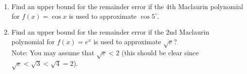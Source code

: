 \documentclass[12pt]{article}
\newif\ifans
\begin{document}
\begin{enumerate}

\item Find an upper bound for the remainder error if the $4$th Maclaurin polynomial for $f(x)=\cos{x}$ is used to approximate $\cos{5^\circ}$.



\ifans{\fbox{\parbox{1\linewidth}{If $f(x)=\cos{x}$, then $\textstyle|f^{(5)}(x)| \leq 1$ for all $x$, and so by the Remainder Estimation Theorem, $\textstyle |R_4(\frac{\pi}{36})| \leq \frac{1}{5!} \left(\frac{\pi}{36} - 0 \right)^5$.
\\ \\ This can be verified with a calculator as follows: \\ The $4$th Maclaurin polynomial for $\cos{x}$ is $\textstyle p_4(x)=1-\frac{1}{2!}x^2+\frac{1}{4!}x^4$.  
\\  Thus $\textstyle \cos{\left(\frac{\pi}{36}\right)} \approx p_4\left(\frac{\pi}{36}\right) \approx 0.996194698705$
\\ Now a calculator tells us that $\textstyle \cos{\left(\frac{\pi}{36}\right)} \approx 0.996194698092$.
\\ So $\textstyle |R_4(\frac{\pi}{36})| = |\cos({\frac{\pi}{36}}) - p_4(\frac{\pi}{36})| \approx 6 \times 10^{-10} < \frac{1}{5!} \left(\frac{\pi}{36}\right)^5 \approx 4.218 \times 10^{-8}$. 
   }}} \fi

\item Find an upper bound for the remainder error if the $2$nd Maclaurin polynomial for $f(x)=e^x$ is used to approximate $\sqrt{e}$?  
\\ Note: You may assume that $\sqrt{e} < 2$ (this should be clear since $\sqrt{e}<\sqrt{3}<\sqrt{4}=2$). 

\ifans{\fbox{\parbox{1\linewidth}{Note that $f(x)=e^x$ is an increasing function.  So for all $x$ on the interval $\textstyle [0, \frac{1}{2}]$  we have $|f^{(3)}(x)| = e^x \leq e^{\frac{1}{2}} < 2$
, and so by the Remainder Estimation Theorem, $\textstyle |R_2(\frac{1}{2})| \leq \frac{2}{3!} \left(\frac{1}{2} - 0 \right)^3 = \frac{1}{24}$.
\\ \\ This can be verified with a calculator as follows: \\ The $2$nd Maclaurin polynomial for $e^x$ is $\textstyle p_2(x)=1+x+\frac{1}{2}x^2$.  
\\  Thus $\textstyle \sqrt{e} \approx p_2(\frac{1}{2}) = 1.625$
\\ Now a calculator tells us that $\textstyle \sqrt{e} \approx 1.648721271$.
\\ So $\textstyle |R_2(\frac{1}{2})| = |\sqrt{e} - p_2(\frac{1}{2})| \approx 0.023721271 < \frac{1}{24} = 0.041\overline{6}$. 
   }}} \fi


\end{enumerate}
\end{document}

